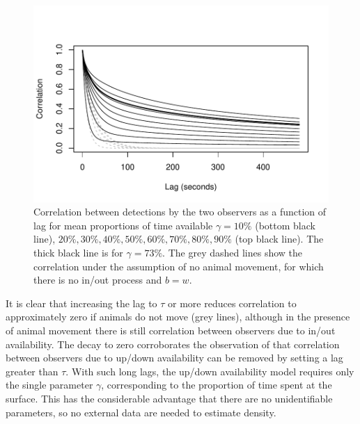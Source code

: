 \documentclass[useAMS, usenatbib, referee]{biom}\usepackage[]{graphicx}\usepackage[]{color}
\makeatletter
\def\maxwidth{ %
  \ifdim\Gin@nat@width>\linewidth
    \linewidth
  \else
    \Gin@nat@width
  \fi
}
\newenvironment{knitrout}{}{} %
\makeatother
\begin{document}
\begin{knitrout}
\color{fgcolor}\begin{figure}

{\centering \includegraphics[width=\maxwidth]{figs/fig_correlation_plot-1} 

}

\caption[Correlation between detections by the two observers as a function of lag for mean proportions of time available \(\gamma=10\%\) (bottom black line), \(20\%, 30\%, 40\%, 50\%, 60\%, 70\%, 80\%, 90\%\) (top black line)]{Correlation between detections by the two observers as a function of lag for mean proportions of time available \(\gamma=10\%\) (bottom black line), \(20\%, 30\%, 40\%, 50\%, 60\%, 70\%, 80\%, 90\%\) (top black line). The thick black line is for \(\gamma=73\%\). The grey dashed lines show the correlation under the assumption of no animal movement, for which there is no in/out process and $b=w$.}\label{fig:fig_correlation_plot}
\end{figure}


\end{knitrout}

It is clear that increasing the lag to $\tau$ or more reduces correlation to approximately zero if animals do not move (grey lines), although in the presence of animal movement there is still correlation between observers due to in/out availability. The decay to zero corroborates the observation of \cite{Stevenson+al:19} that correlation between observers due to up/down availability can be removed by setting a lag greater than $\tau$. With such long lags, the up/down availability model requires only the single parameter $\gamma$, corresponding to the proportion of time spent at the surface. This has the considerable advantage that there are no unidentifiable parameters, so no external data are needed to estimate density.
\end{document}
